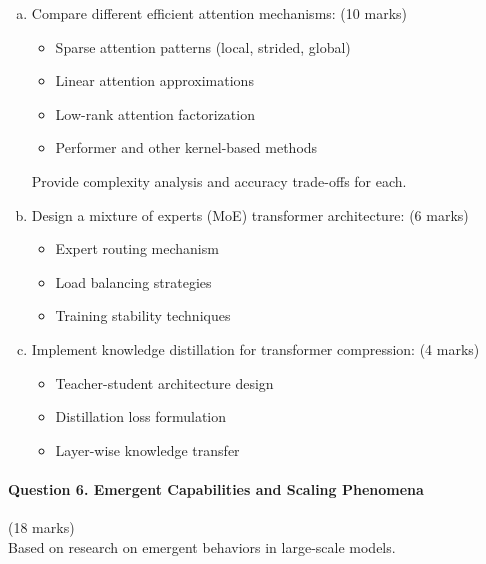 \documentclass[12pt]{article}
\newcommand{\shortanswer}{\vspace{2cm}}
\newcommand{\mediumanswer}{\vspace{3cm}}
\begin{document}
\begin{enumerate}[(a)]
    \item Compare different efficient attention mechanisms: \hfill (10 marks)
    \begin{itemize}
        \item Sparse attention patterns (local, strided, global)
        \item Linear attention approximations
        \item Low-rank attention factorization
        \item Performer and other kernel-based methods
    \end{itemize}
    
    Provide complexity analysis and accuracy trade-offs for each.
    
    \mediumanswer
    
    \item Design a mixture of experts (MoE) transformer architecture: \hfill (6 marks)
    \begin{itemize}
        \item Expert routing mechanism
        \item Load balancing strategies
        \item Training stability techniques
    \end{itemize}
    
    \mediumanswer
    
    \item Implement knowledge distillation for transformer compression: \hfill (4 marks)
    \begin{itemize}
        \item Teacher-student architecture design
        \item Distillation loss formulation
        \item Layer-wise knowledge transfer
    \end{itemize}
    
    \shortanswer
\end{enumerate}

\newpage
\paragraph{Question 6. Emergent Capabilities and Scaling Phenomena}\hfill (18 marks)\\
Based on research on emergent behaviors in large-scale models.
\end{document}
